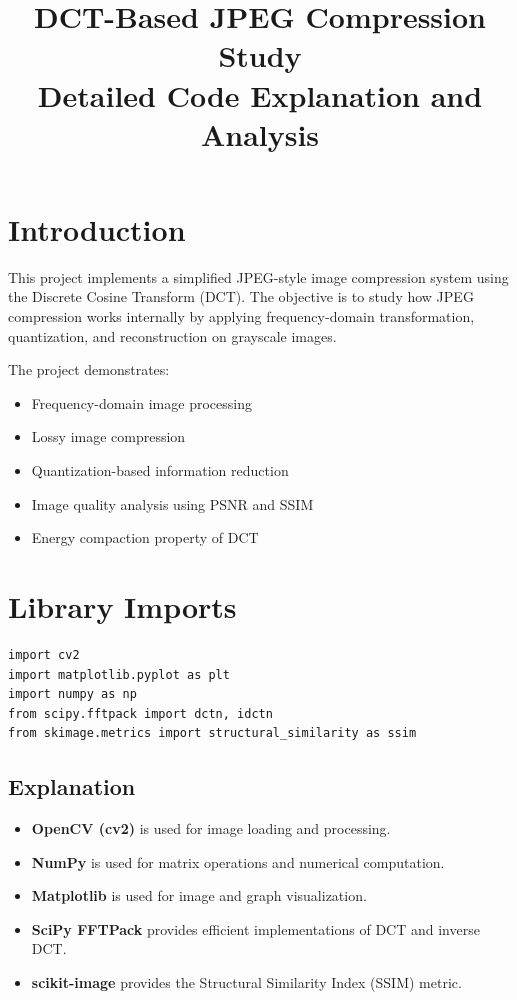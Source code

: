 \documentclass[12pt,a4paper]{article}
\title{\textbf{DCT-Based JPEG Compression Study}\\
Detailed Code Explanation and Analysis}
\author{}
\date{}
\begin{document}
\maketitle

\tableofcontents
\newpage

\section{Introduction}

This project implements a simplified JPEG-style image compression system using the Discrete Cosine Transform (DCT). The objective is to study how JPEG compression works internally by applying frequency-domain transformation, quantization, and reconstruction on grayscale images.

The project demonstrates:
\begin{itemize}
    \item Frequency-domain image processing
    \item Lossy image compression
    \item Quantization-based information reduction
    \item Image quality analysis using PSNR and SSIM
    \item Energy compaction property of DCT
\end{itemize}

\section{Library Imports}

\begin{lstlisting}
import cv2
import matplotlib.pyplot as plt
import numpy as np
from scipy.fftpack import dctn, idctn
from skimage.metrics import structural_similarity as ssim
\end{lstlisting}

\subsection{Explanation}

\begin{itemize}
    \item \textbf{OpenCV (cv2)} is used for image loading and processing.
    \item \textbf{NumPy} is used for matrix operations and numerical computation.
    \item \textbf{Matplotlib} is used for image and graph visualization.
    \item \textbf{SciPy FFTPack} provides efficient implementations of DCT and inverse DCT.
    \item \textbf{scikit-image} provides the Structural Similarity Index (SSIM) metric.
\end{itemize}
\end{document}
